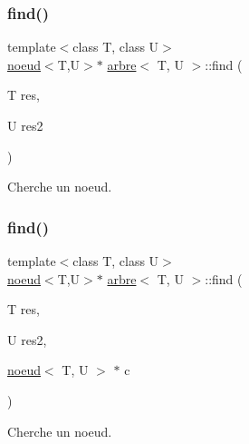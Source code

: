 \subsubsection{\texorpdfstring{find()}{find()}\hspace{0.1cm}{\footnotesize\ttfamily [1/2]}}
{\footnotesize\ttfamily template$<$class T, class U$>$ \\
\hyperlink{classnoeud}{noeud}$<$T,U$>$$\ast$ \hyperlink{classarbre}{arbre}$<$ T, U $>$\+::find (\begin{DoxyParamCaption}\item[{T}]{res,  }\item[{U}]{res2 }\end{DoxyParamCaption})\hspace{0.3cm}{\ttfamily [inline]}}



Cherche un noeud. 

\mbox{\label{classarbre_a865863585882b2129eabec7bb34e7710}} 
\subsubsection{\texorpdfstring{find()}{find()}\hspace{0.1cm}{\footnotesize\ttfamily [2/2]}}
{\footnotesize\ttfamily template$<$class T, class U$>$ \\
\hyperlink{classnoeud}{noeud}$<$T,U$>$$\ast$ \hyperlink{classarbre}{arbre}$<$ T, U $>$\+::find (\begin{DoxyParamCaption}\item[{T}]{res,  }\item[{U}]{res2,  }\item[{\hyperlink{classnoeud}{noeud}$<$ T, U $>$ $\ast$}]{c }\end{DoxyParamCaption})\hspace{0.3cm}{\ttfamily [inline]}}



Cherche un noeud. 

\mbox{\label{classarbre_acacc6bf49c2c7b4d50b865ad433d0f3e}} 
